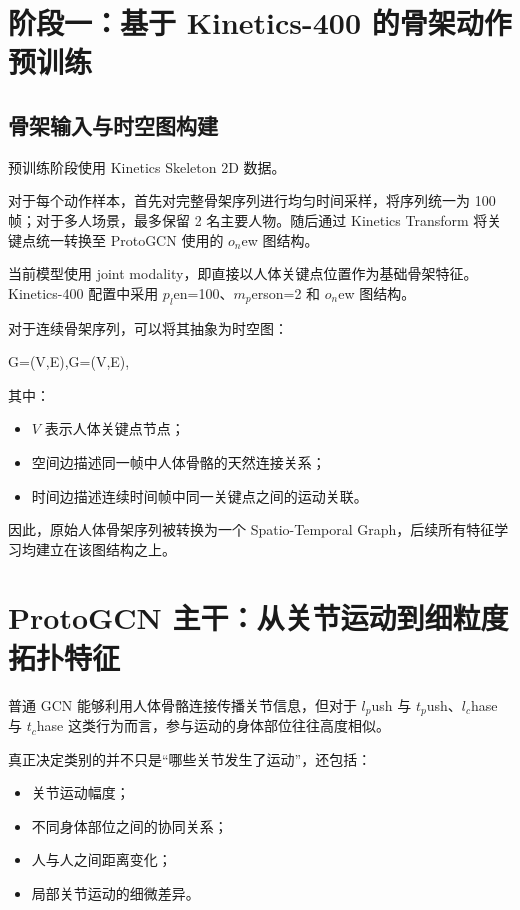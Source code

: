 \section{阶段一：基于 Kinetics-400 的骨架动作预训练}

\subsection{骨架输入与时空图构建}

预训练阶段使用 Kinetics Skeleton 2D 数据。

对于每个动作样本，首先对完整骨架序列进行均匀时间采样，将序列统一为 100 帧；对于多人场景，最多保留 2 名主要人物。随后通过 Kinetics Transform 将关键点统一转换至 ProtoGCN 使用的 \(o_n\)ew 图结构。

当前模型使用 joint modality，即直接以人体关键点位置作为基础骨架特征。Kinetics-400 配置中采用 \(p_l\)en=100、\(m_p\)erson=2 和 \(o_n\)ew 图结构。

对于连续骨架序列，可以将其抽象为时空图：

G=(V,E),G=(V,E),

其中：

\begin{itemize}
\item \(V\) 表示人体关键点节点；
\item 空间边描述同一帧中人体骨骼的天然连接关系；
\item 时间边描述连续时间帧中同一关键点之间的运动关联。
\end{itemize}

因此，原始人体骨架序列被转换为一个 Spatio-Temporal Graph，后续所有特征学习均建立在该图结构之上。


\section{ProtoGCN 主干：从关节运动到细粒度拓扑特征}

普通 GCN 能够利用人体骨骼连接传播关节信息，但对于 \(l_p\)ush 与 \(t_p\)ush、\(l_c\)hase 与 \(t_c\)hase 这类行为而言，参与运动的身体部位往往高度相似。

真正决定类别的并不只是“哪些关节发生了运动”，还包括：

\begin{itemize}
\item 关节运动幅度；
\item 不同身体部位之间的协同关系；
\item 人与人之间距离变化；
\item 局部关节运动的细微差异。
\end{itemize}

